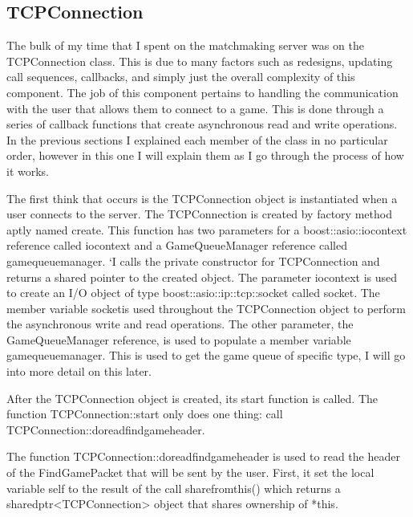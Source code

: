 \documentclass[conference]{IEEEtran}
\begin{document}
\subsection{TCPConnection}
The bulk of my time that I spent on the matchmaking server was on the TCPConnection class.
This is due to many factors such as redesigns, updating call sequences, callbacks, and simply just the overall complexity of this component.
The job of this component pertains  to handling the communication with the user that allows them to connect to a game.
This is done through a series of callback functions that create asynchronous read and write operations.
In the previous sections I explained each member of the class in no particular order, however in this one I will explain them as I go through the process of how it works.

The first think that occurs is the TCPConnection object is instantiated when a user connects to the server.
The TCPConnection is created by factory method aptly named create.
This function has two parameters for a boost::asio::io\textunderscore context reference called io\textunderscore context and a GameQueueManager reference called game\textunderscore queue\textunderscore manager.
`I calls the private constructor for TCPConnection and returns a shared pointer to the created object. 
The parameter  io\textunderscore context is used to create  an I/O object of type boost::asio::ip::tcp::socket called socket\textunderscore .
The member variable socket\textunderscore  is used throughout the TCPConnection object to perform the asynchronous write and read operations.
The other parameter, the GameQueueManager reference, is used to populate a member variable game\textunderscore queue\textunderscore manager\textunderscore .
This is used to get the game queue of specific type, I will go into more detail on this later.

After the TCPConnection object is created, its start function is called.
The function TCPConnection::start only does one thing: call TCPConnection::do\textunderscore read\textunderscore find\textunderscore game\textunderscore header.

The function TCPConnection::do\textunderscore read\textunderscore find\textunderscore game\textunderscore header is used to read the header of the FindGamePacket that will be sent by the user.
First, it  set the local variable self to the result of the call share\textunderscore from\textunderscore this() which returns a shared\textunderscore ptr<TCPConnection> object that shares ownership of *this.
\end{document}
